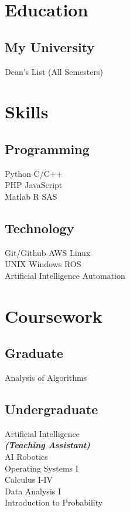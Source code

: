 \documentclass[]{deedy-resume-reversed}
\begin{document}
\begin{minipage}[t]{0.33\textwidth}
\section{Education}
\subsection{My University}
Dean's List (All Semesters) \\
\sectionsep
\section{Skills}
\subsection{Programming}
Python \textbullet{} C/C++ \\
PHP \textbullet{} JavaScript \\
Matlab \textbullet{} R \textbullet{} SAS \\
\sectionsep
\subsection{Technology}
Git/Github \textbullet{} AWS \textbullet{} Linux \\
UNIX \textbullet{} Windows \textbullet{} ROS \\
Artificial Intelligence \textbullet{} Automation \\
\sectionsep
\section{Coursework}
\subsection{Graduate}
Analysis of Algorithms
\sectionsep
\subsection{Undergraduate}
Artificial Intelligence \\
{\footnotesize \textit{\textbf{(Teaching Assistant) }}} \\
AI Robotics \\
Operating Systems I \\
Calculus I-IV \\
Data Analysis I \\
Introduction to Probability \\
\sectionsep

\end{minipage}
\end{document}
